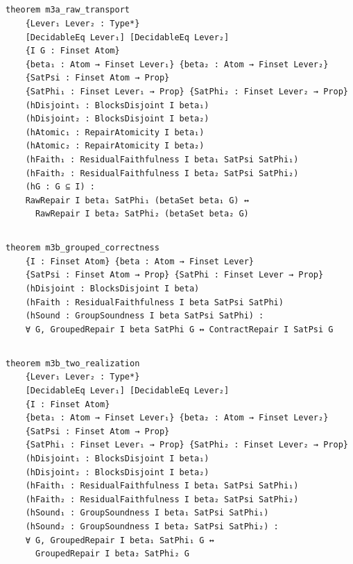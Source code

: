 \subsection{}
\begin{Verbatim}[fontsize=\scriptsize]
theorem m3a_raw_transport
    {Lever₁ Lever₂ : Type*}
    [DecidableEq Lever₁] [DecidableEq Lever₂]
    {I G : Finset Atom}
    {beta₁ : Atom → Finset Lever₁} {beta₂ : Atom → Finset Lever₂}
    {SatPsi : Finset Atom → Prop}
    {SatPhi₁ : Finset Lever₁ → Prop} {SatPhi₂ : Finset Lever₂ → Prop}
    (hDisjoint₁ : BlocksDisjoint I beta₁)
    (hDisjoint₂ : BlocksDisjoint I beta₂)
    (hAtomic₁ : RepairAtomicity I beta₁)
    (hAtomic₂ : RepairAtomicity I beta₂)
    (hFaith₁ : ResidualFaithfulness I beta₁ SatPsi SatPhi₁)
    (hFaith₂ : ResidualFaithfulness I beta₂ SatPsi SatPhi₂)
    (hG : G ⊆ I) :
    RawRepair I beta₁ SatPhi₁ (betaSet beta₁ G) ↔
      RawRepair I beta₂ SatPhi₂ (betaSet beta₂ G)
\end{Verbatim}

\subsection{}
\begin{Verbatim}[fontsize=\scriptsize]
theorem m3b_grouped_correctness
    {I : Finset Atom} {beta : Atom → Finset Lever}
    {SatPsi : Finset Atom → Prop} {SatPhi : Finset Lever → Prop}
    (hDisjoint : BlocksDisjoint I beta)
    (hFaith : ResidualFaithfulness I beta SatPsi SatPhi)
    (hSound : GroupSoundness I beta SatPsi SatPhi) :
    ∀ G, GroupedRepair I beta SatPhi G ↔ ContractRepair I SatPsi G
\end{Verbatim}

\subsection{}
\begin{Verbatim}[fontsize=\scriptsize]
theorem m3b_two_realization
    {Lever₁ Lever₂ : Type*}
    [DecidableEq Lever₁] [DecidableEq Lever₂]
    {I : Finset Atom}
    {beta₁ : Atom → Finset Lever₁} {beta₂ : Atom → Finset Lever₂}
    {SatPsi : Finset Atom → Prop}
    {SatPhi₁ : Finset Lever₁ → Prop} {SatPhi₂ : Finset Lever₂ → Prop}
    (hDisjoint₁ : BlocksDisjoint I beta₁)
    (hDisjoint₂ : BlocksDisjoint I beta₂)
    (hFaith₁ : ResidualFaithfulness I beta₁ SatPsi SatPhi₁)
    (hFaith₂ : ResidualFaithfulness I beta₂ SatPsi SatPhi₂)
    (hSound₁ : GroupSoundness I beta₁ SatPsi SatPhi₁)
    (hSound₂ : GroupSoundness I beta₂ SatPsi SatPhi₂) :
    ∀ G, GroupedRepair I beta₁ SatPhi₁ G ↔
      GroupedRepair I beta₂ SatPhi₂ G
\end{Verbatim}

